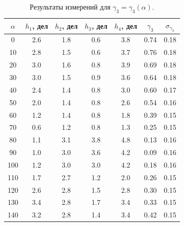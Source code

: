 \documentclass[a4paper,12pt]{article}
\begin{document}
\begin{table}[h]
\begin{tabular}{|c|c|c|c|c|c|c|}
\hline
$\alpha$ & $h_1$, дел & $h_2$, дел & $h_3$, дел & $h_4$, дел & $\gamma_3$ & $\sigma_{\gamma_3}$ \\ \hline
0        & 2.6        & 1.8        & 0.6        & 3.8        & 0.74       & 0.18      \\ \hline
10       & 2.8        & 1.5        & 0.6        & 3.7        & 0.76       & 0.18      \\ \hline
20       & 3.0        & 1.6        & 0.8        & 3.9        & 0.69       & 0.18      \\ \hline
30       & 3.0        & 1.5        & 0.9        & 3.6        & 0.64       & 0.18      \\ \hline
40       & 2.4        & 1.4        & 0.8        & 3.0        & 0.60       & 0.17      \\ \hline
50       & 2.0        & 1.4        & 0.8        & 2.6        & 0.54       & 0.16      \\ \hline
60       & 1.2        & 1.4        & 0.8        & 1.8        & 0.39       & 0.15      \\ \hline
70       & 0.6        & 1.2        & 0.8        & 1.3        & 0.25       & 0.15      \\ \hline
80       & 1.1        & 3.1        & 3.8        & 4.8        & 0.13       & 0.16      \\ \hline
90       & 1.0        & 3.0        & 3.6        & 4.2        & 0.09       & 0.16      \\ \hline
100      & 1.2       & 3.0        & 3.0          & 4.2        & 0.18       & 0.16      \\ \hline
110      & 1.7        & 2.7        & 1.2        & 2.0        & 0.26       & 0.15      \\ \hline
120      & 2.6        & 2.8        & 1.5        & 2.8        & 0.30       & 0.15      \\ \hline
130      & 3.4        & 2.8        & 1.7        & 3.4        & 0.33       & 0.15      \\ \hline
140      & 3.2        & 2.8        & 1.4        & 3.4        & 0.42       & 0.15      \\ \hline
\end{tabular}
\centering
\caption{Результаты измерений для $\gamma_3 = \gamma_3(\alpha)$.}
\end{table}
\end{document}

